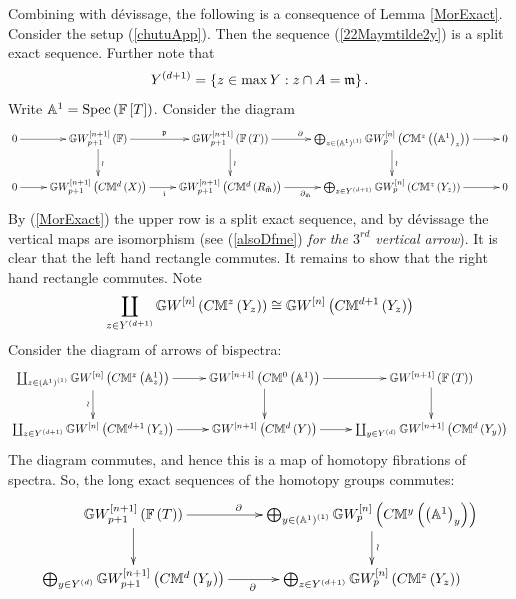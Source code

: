 \documentclass[12pt]{article}
\begin{document}
\vspace{3mm} 
Combining with d\'{e}vissage, the following is a consequence of Lemma \ref{MorExact}.
\bT\label{spexactLocal}{\rm 
Consider the setup (\ref{chutuApp}). Then the sequence (\ref{22Maymtilde2y}) is a split exact sequence.
 Further note that 
$$
Y^{\left( d+1\right)}=\left\{ z\in \max Y: z\cap A=\mathfrak {m}\right\}.
$$
}
\eT
\pf Write  ${\mathbb{A}}^1=\mathrm{Spec}\left({\mathbb{F}}\left[ T\right]\right)$. Consider the diagram 
$$%
\diagram 
0  \ar[r] & 
{\BG}W_{p+1}^{\LRt{n+1}}\LRf{{\BF}} \ar[r]^{\p}\ar[d]^{\wr} &
{\BG}W_{p+1}^{\LRt{n+1}}\LRf{{\BF}\LRf{T}}\ar[r]^{\partial\qquad}\ar[d]^{\wr} &
\bigoplus_{z\in \LRf{{\BA}^1}^{\LRf{1}}} {\BG}W_{p}^{\LRt{n}}\LRf{C{\BM}^z\LRf{\LRf{{\BA}^1}_z}}  \ar[r] \ar[d]^{\wr}& 
0\\
0\ar[r]& {\BG}W_{p+1}^{\LRt{n+1}}\LRf{C{\BM}^d\LRf{X}} \ar[r]_{\i} & 
{\BG}W_{p+1}^{\LRt{n+1}}\LRf{C{\BM}^d\LRf{R_{\tilde{\m}}}} \ar[r]_{\partial_{\tilde{\m}}\quad}& \bigoplus_{z\in Y^{\LRf{d+1}}}
{\BG}W^{\LRt{n}}_p\LRf{C{\BM}^z\LRf{{Y}_z}} \ar[r] &0 \\
\enddiagram 
$$ %
 By (\ref{MorExact}) the upper row is a split exact sequence, and by d\'{e}vissage \cite[Thm 6.1]{M25} the vertical maps are isomorphism (see (\ref{alsoDfme}) {\it for the $3^{rd}$ vertical arrow}). It is clear that the left hand rectangle commutes. It remains to show that the right hand rectangle commutes. Note
 $$
 \coprod_{z\in Y^{\left( d+1\right)}}
{\mathbb{G}}W^{\left[ n\right]}\left( C{\mathbb{M}}^z\left( {Y}_z\right)\right) \cong {\mathbb{G}}W^{\left[ n\right]}\left( C{\mathbb{M}}^{d+1}\left( {Y}_z\right)\right)
$$ Consider the diagram of arrows of bispectra:
 $$
 \diagram
  \coprod_{z\in \LRf{{\BA}^1}^{\LRf{1}}} {\BG}W^{\LRt{n}}\LRf{C{\BM}^{z}\LRf{{\BA}^1_z}}\ar[r] \ar[d]_{\wr}& {\BG}W^{\LRt{n+1}}\LRf{C{\BM}^{0}\LRf{{\BA}^1}}\ar[r] \ar[d]& 
{\BG}W^{\LRt{n+1}}\LRf{{\BF}\LRf{T}}\ar[d]\\
%
 \coprod_{z\in Y^{\LRf{d+1}}} {\BG}W^{\LRt{n}}\LRf{C{\BM}^{d+1}\LRf{Y_z}}\ar[r] & {\BG}W^{\LRt{n+1}}
 \LRf{C{\BM}^{d}\LRf{Y}}\ar[r] & 
\coprod_{y\in Y^{\LRf{d}}}{\BG}W^{\LRt{n+1}}\LRf{C{\BM}^{d}\LRf{Y_y}}\\
\enddiagram
$$
The %
diagram commutes, and hence this is a map of homotopy fibrations of spectra. So, the long exact sequences of the homotopy groups commutes:
$$%
\diagram 
{\BG}W_{p+1}^{\LRt{n+1}}\LRf{{\BF}\LRf{T}}\ar[r]^{\partial\qquad}\ar[d] &
\bigoplus_{y\in \LRf{{\BA}^1}^{\LRf{1}}} {\BG}W_{p}^{\LRt{n}}\LRf{C{\BM}^y\LRf{\LRf{{\BA}^1}_y}}   \ar[d]^{\wr}\\
\bigoplus_{y\in Y^{\LRf{d}}}{\BG}W_{p+1}^{\LRt{n+1}}\LRf{C{\BM}^{d}\LRf{Y_y}}%
\ar[r]_{\partial}& \bigoplus_{z\in Y^{\LRf{d+1}}}
{\BG}W^{\LRt{n}}_p\LRf{C{\BM}^z\LRf{{Y}_z}}  \\
\enddiagram 
$$
\end{document}
